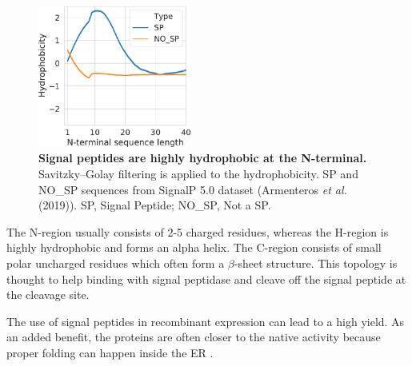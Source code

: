 \begin{figure}
  \begin{center}
    \includegraphics[width=0.45\textwidth]{chapters/Introduction/SignalPeptide/Figures/sp_nosp_lineplot.pdf}
    \caption[Signal peptides are highly hydrophobic at the N-terminal.]{\textbf{Signal peptides are highly hydrophobic at the N-terminal.} Savitzky–Golay filtering is applied to the hydrophobicity. SP and NO\_SP sequences from SignalP 5.0 dataset (Armenteros \textit{et al.} (2019)). SP, Signal Peptide; NO\_SP, Not a SP.}%
    \label{fig:signal_peptides}
  \end{center}
\end{figure}
The N-region usually consists of 2-5 charged residues, whereas the H-region is highly hydrophobic and forms an alpha helix. The C-region consists of small polar uncharged residues which often form a $\beta$-sheet structure. This topology is thought to help binding with signal peptidase and cleave off the signal peptide at the cleavage site. 


The use of signal peptides in recombinant expression can lead to a high yield. As an added benefit, the proteins are often closer to the native activity because proper folding can happen inside the ER \cite{Futatsumori-Sugai2010-iu, Karyolaimos2019-ip}. 

